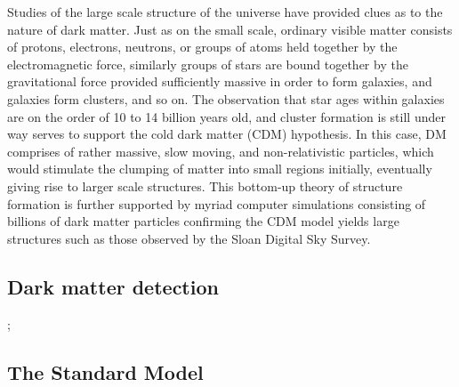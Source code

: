 Studies of the large scale structure of the universe have provided clues as to the nature of dark matter. Just as on the small scale, ordinary visible matter consists of protons, electrons, neutrons, or groups of atoms held together by the electromagnetic force, similarly groups of stars are bound together by the gravitational force provided sufficiently massive in order to form galaxies, and galaxies form clusters, and so on. The observation that star ages within galaxies are on the order of 10 to 14 billion years old, and cluster formation is still under way serves to support the cold dark matter (CDM) hypothesis. In this case, DM comprises of rather massive, slow moving, and non-relativistic particles, which would stimulate the clumping of matter into small regions initially, eventually giving rise to larger scale structures. This bottom-up theory of structure formation is further supported by myriad computer simulations consisting of billions of dark matter particles confirming the CDM model yields large structures such as those observed by the Sloan Digital Sky Survey. 

\subsection{Dark matter detection}
\label{subsec:DMsearches}

\begin{center}
;
\end{center}

\subsection{The Standard Model}
\label{subsec:SM}


